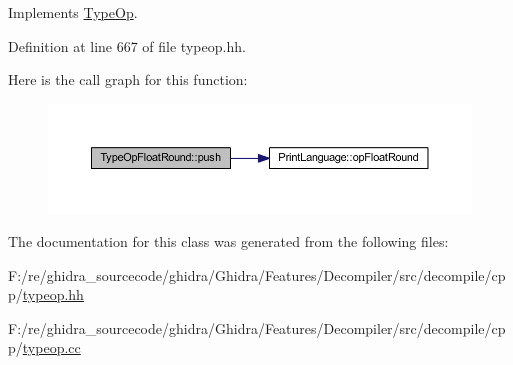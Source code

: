 Implements \mbox{\hyperlink{class_type_op_ac9c9544203ed74dabe6ac662b653b2af}{Type\+Op}}.



Definition at line 667 of file typeop.\+hh.

Here is the call graph for this function\+:
\nopagebreak
\begin{figure}[H]
\begin{center}
\leavevmode
\includegraphics[width=350pt]{class_type_op_float_round_ae0b3d766f791e867f8e9f037b9c94d4f_cgraph}
\end{center}
\end{figure}


The documentation for this class was generated from the following files\+:\begin{DoxyCompactItemize}
\item 
F\+:/re/ghidra\+\_\+sourcecode/ghidra/\+Ghidra/\+Features/\+Decompiler/src/decompile/cpp/\mbox{\hyperlink{typeop_8hh}{typeop.\+hh}}\item 
F\+:/re/ghidra\+\_\+sourcecode/ghidra/\+Ghidra/\+Features/\+Decompiler/src/decompile/cpp/\mbox{\hyperlink{typeop_8cc}{typeop.\+cc}}\end{DoxyCompactItemize}
